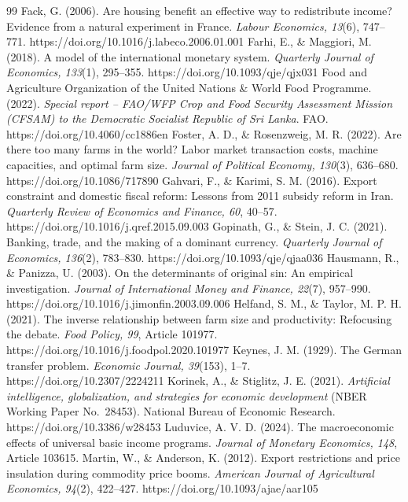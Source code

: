 \documentclass[preprint,review,12pt]{elsarticle}
\begin{document}
\begin{thebibliography}{99}
 Fack, G. (2006). Are housing benefit an effective way to redistribute income? Evidence from a natural experiment in France. \emph{Labour Economics, 13}(6), 747--771. https://doi.org/10.1016/j.labeco.2006.01.001 
 Farhi, E., \& Maggiori, M. (2018). A model of the international monetary system. \emph{Quarterly Journal of Economics, 133}(1), 295--355. https://doi.org/10.1093/qje/qjx031 
 Food and Agriculture Organization of the United Nations \& World Food Programme. (2022). \emph{Special report -- FAO/WFP Crop and Food Security Assessment Mission (CFSAM) to the Democratic Socialist Republic of Sri Lanka}. FAO. https://doi.org/10.4060/cc1886en 
 Foster, A. D., \& Rosenzweig, M. R. (2022). Are there too many farms in the world? Labor market transaction costs, machine capacities, and optimal farm size. \emph{Journal of Political Economy, 130}(3), 636--680. https://doi.org/10.1086/717890 
 Gahvari, F., \& Karimi, S. M. (2016). Export constraint and domestic fiscal reform: Lessons from 2011 subsidy reform in Iran. \emph{Quarterly Review of Economics and Finance, 60}, 40--57. https://doi.org/10.1016/j.qref.2015.09.003 
 Gopinath, G., \& Stein, J. C. (2021). Banking, trade, and the making of a dominant currency. \emph{Quarterly Journal of Economics, 136}(2), 783--830. https://doi.org/10.1093/qje/qjaa036 
 Hausmann, R., \& Panizza, U. (2003). On the determinants of original sin: An empirical investigation. \emph{Journal of International Money and Finance, 22}(7), 957--990. https://doi.org/10.1016/j.jimonfin.2003.09.006 
 Helfand, S. M., \& Taylor, M. P. H. (2021). The inverse relationship between farm size and productivity: Refocusing the debate. \emph{Food Policy, 99}, Article 101977. https://doi.org/10.1016/j.foodpol.2020.101977 
 Keynes, J. M. (1929). The German transfer problem. \emph{Economic Journal, 39}(153), 1--7. https://doi.org/10.2307/2224211 
 Korinek, A., \& Stiglitz, J. E. (2021). \emph{Artificial intelligence, globalization, and strategies for economic development} (NBER Working Paper No.~28453). National Bureau of Economic Research. https://doi.org/10.3386/w28453 
 Luduvice, A. V. D. (2024). The macroeconomic effects of universal basic income programs. \emph{Journal of Monetary Economics, 148}, Article 103615. 
 Martin, W., \& Anderson, K. (2012). Export restrictions and price insulation during commodity price booms. \emph{American Journal of Agricultural Economics, 94}(2), 422--427. https://doi.org/10.1093/ajae/aar105 

\end{thebibliography}
\end{document}
